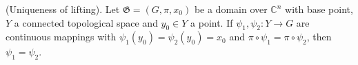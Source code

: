 (Uniqueness of lifting). Let $\mathfrak{G} = (G, \pi, x_0)$ be a domain over $\mathbb{C}^n$ with base point, $Y$ a connected topological space and $y_0 \in Y$ a point. If $\psi_1, \psi_2: Y \rightarrow G$ are continuous mappings with $\psi_1(y_0) = \psi_2(y_0) = x_0$ and $\pi \circ \psi_1 = \pi \circ \psi_2$, then $\psi_1 = \psi_2$.
